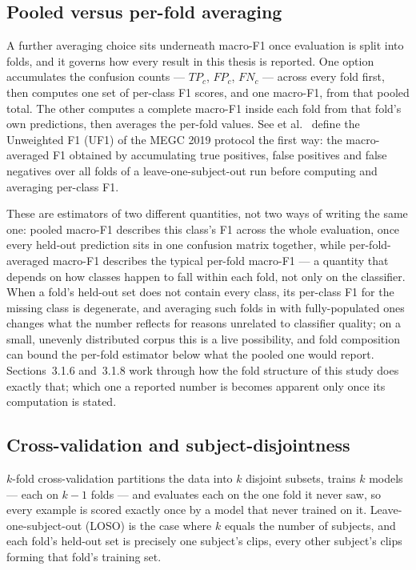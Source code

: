 \subsection{Pooled versus per-fold averaging}
\label{sec:pooled-vs-fold}

A further averaging choice sits underneath macro-F1 once evaluation is split into folds, and it governs how every result in this thesis is reported. One option accumulates the confusion counts --- $TP_c$, $FP_c$, $FN_c$ --- across every fold first, then computes one set of per-class F1 scores, and one macro-F1, from that pooled total. The other computes a complete macro-F1 inside each fold from that fold's own predictions, then averages the per-fold values. See et al.~\cite{see2019} define the Unweighted F1 (UF1) of the MEGC 2019 protocol the first way: the macro-averaged F1 obtained by accumulating true positives, false positives and false negatives over all folds of a leave-one-subject-out run before computing and averaging per-class F1.

These are estimators of two different quantities, not two ways of writing the same one: pooled macro-F1 describes this class's F1 across the whole evaluation, once every held-out prediction sits in one confusion matrix together, while per-fold-averaged macro-F1 describes the typical per-fold macro-F1 --- a quantity that depends on how classes happen to fall within each fold, not only on the classifier. When a fold's held-out set does not contain every class, its per-class F1 for the missing class is degenerate, and averaging such folds in with fully-populated ones changes what the number reflects for reasons unrelated to classifier quality; on a small, unevenly distributed corpus this is a live possibility, and fold composition can bound the per-fold estimator below what the pooled one would report. Sections~3.1.6 and~3.1.8 work through how the fold structure of this study does exactly that; which one a reported number is becomes apparent only once its computation is stated.

\subsection{Cross-validation and subject-disjointness}
\label{sec:cross-validation}

$k$-fold cross-validation partitions the data into $k$ disjoint subsets, trains $k$ models --- each on $k-1$ folds --- and evaluates each on the one fold it never saw, so every example is scored exactly once by a model that never trained on it. Leave-one-subject-out (LOSO) is the case where $k$ equals the number of subjects, and each fold's held-out set is precisely one subject's clips, every other subject's clips forming that fold's training set.

